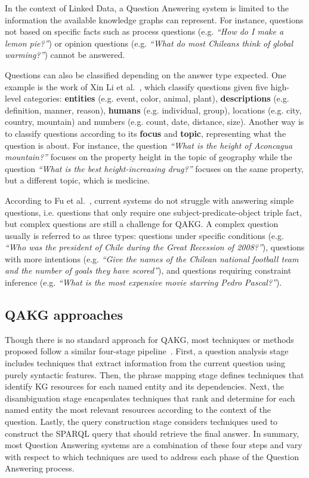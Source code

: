 In the context of Linked Data, a Question Answering system is limited to the information the 
available knowledge graphs can represent. For instance, questions not based on specific facts 
such as process questions (e.g. \textit{“How do I make a lemon pie?”}) or opinion questions 
(e.g. \textit{“What do most Chileans think of global warming?”}) cannot be answered.

Questions can also be classified depending on the answer type expected. One example is the work 
of Xin Li et al.~\cite{qa:LiR02}, which classify questions given five high-level categories: 
\textbf{entities} (e.g. event, color, animal, plant), \textbf{descriptions} (e.g. definition, 
manner, reason), \textbf{humans} (e.g. individual, group), locations (e.g. city, country, 
mountain) and numbers (e.g. count, date, distance, size). Another way is to classify questions 
according to its \textbf{focus} and \textbf{topic}, representing what the question is about. 
For instance, the question \textit{“What is the height of Aconcagua mountain?”} focuses on the 
property height in the topic of geography while the question \textit{“What is the best 
height-increasing drug?”} focuses on the same property, but a different topic, which is medicine.

According to Fu et al.~\cite{qa:FuQTLYS20abs-2007-13069}, current systems do not struggle with 
answering simple questions, i.e. questions that only require one subject-predicate-object 
triple fact, but complex questions are still a challenge for QAKG. A complex question usually 
is referred to as three types: questions under specific conditions (e.g. \textit{“Who was the 
president of Chile during the Great Recession of 2008?”}), questions with more intentions (e.g. 
\textit{“Give the names of the Chilean national football team and the number of goals they have 
scored”}), and questions requiring constraint inference (e.g. \textit{“What is the most 
expensive movie starring Pedro Pascal?”}).

\subsection{QAKG approaches}
Though there is no standard approach for QAKG, most techniques or methods proposed follow a 
similar four-stage pipeline~\cite{qa:core-techniques-DiefenbachLSM18}. First, a question 
analysis stage includes techniques that extract information from the current question using 
purely syntactic features. Then, the phrase mapping stage defines techniques that identify KG 
resources for each named entity and its dependencies. Next, the disambiguation stage 
encapsulates techniques that rank and determine for each named entity the most relevant 
resources according to the context of the question. Lastly, the query construction stage 
considers techniques used to construct the SPARQL query that should retrieve the final answer. 
In summary, most Question Answering systems are a combination of these four steps and vary with 
respect to which techniques are used to address each phase of the Question Answering process.

